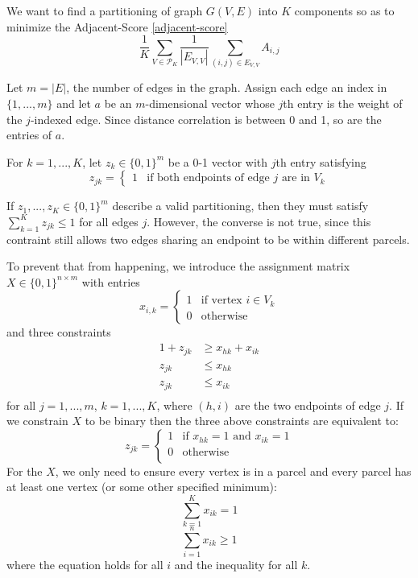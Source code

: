 We want to find a partitioning of graph $G(V,E)$ into $K$ components
so as to minimize the Adjacent-Score \ref{adjacent-score}
\[ \frac{1}{K} \sum_{V \in \mathcal{P}_K}
   \frac{1}{|E_{V,V}|} \sum_{(i,j) \in E_{V,V}} A_{i,j}
\]

Let $m = |E|$, the number of edges in the graph. Assign each edge an
index in $\{1, ..., m\}$ and 
let $a$ be an $m$-dimensional vector whose $j$th entry is the weight of
the $j$-indexed edge. Since distance correlation is between 0 and 1, so
are the entries of $a$.

For $k = 1, ..., K$, let $z_k \in \{0, 1\}^m$ be a 0-1 vector with
$j$th entry satisfying
\[ z_{jk} = \begin{cases}
  1 & \text{if both endpoints of edge } j \text{ are in } V_k
\end{cases} \]

If $z_1, ..., z_K \in \{0, 1\}^m$ describe a valid partitioning, then
they must satisfy $\sum_{k=1}^K z_{jk} \leq 1$ for all edges $j$.
However, the converse is not true, since this contraint still allows two
edges sharing an endpoint to be within different parcels.

To prevent that from happening, we introduce the assignment matrix
$X \in \{0, 1\}^{n \times m}$ with entries
\[ x_{i,k} = \begin{cases}
  1 & \text{if vertex } i \in V_k \\
  0 & \text{otherwise}
\end{cases} \]
and three constraints
\begin{align*}
1 + z_{jk} &\geq x_{hk} + x_{ik} \\
z_{jk} &\leq x_{hk} \\
z_{jk} &\leq x_{ik} \\
\end{align*}
for all $j = 1, ..., m$, $k = 1, ..., K$, where $(h,i)$ are the two
endpoints of edge $j$. If we constrain $X$ to be binary then the three
above constraints are equivalent to:
\[ z_{jk} = \begin{cases}
  1 & \text{if } x_{hk} = 1 \text{ and } x_{ik} = 1 \\
  0 & \text{otherwise} \\
\end{cases}\]
For the $X$, we only need to ensure every vertex is in a parcel and every
parcel has at least one vertex (or some other specified minimum):
\[ \sum_{k=1}^K x_{ik} = 1 \]
\[ \sum_{i=1}^n x_{ik} \geq 1 \]
where the equation holds for all $i$ and the inequality for all $k$.

